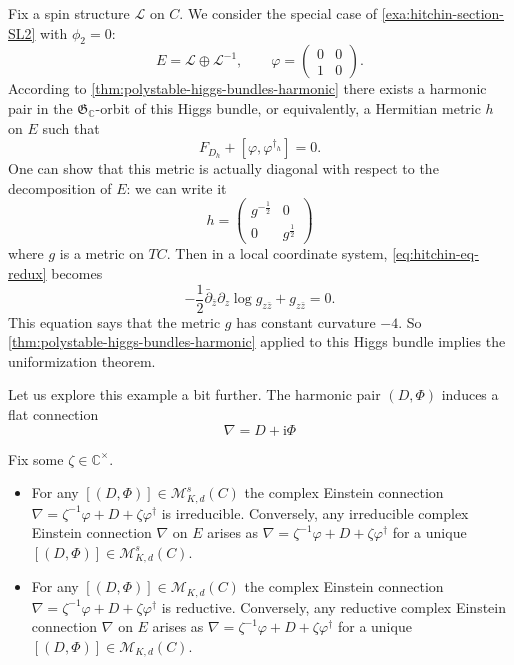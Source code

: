 \documentclass[12pt,letterpaper,reqno]{article}
\numberwithin{equation}{section}
\newcommand{\fG}{{\mathfrak G}}
\newcommand{\cL}{\ensuremath{\mathcal L}}
\newcommand{\cM}{\ensuremath{\mathcal M}}
\newcommand{\C}{\ensuremath{\mathbb C}}
\newcommand{\half}{\ensuremath{\frac{1}{2}}}
\newcommand{\I}{{\mathrm i}}
\newcommand{\fixme}[1]{{\color{orange}{[#1]}}}
\begin{document}
\begin{example} Fix a spin 
structure $\cL$ on $C$. We consider the special case of
\autoref{exa:hitchin-section-SL2} with $\phi_2 = 0$:
\begin{equation}
  E = \cL \oplus \cL^{-1}, \qquad \varphi = \begin{pmatrix} 0 & 0 \\ 1 &0 \end{pmatrix}.
\end{equation}
According to \autoref{thm:polystable-higgs-bundles-harmonic}
there exists a harmonic pair in the $\fG_\C$-orbit of this
Higgs bundle, or equivalently, a Hermitian metric $h$ on $E$ such that
\begin{equation} \label{eq:hitchin-eq-redux}
  F_{D_h} + [\varphi, \varphi^{\dagger_h}] = 0.
\end{equation}
One can show \fixme{...} that
this metric is actually diagonal with respect to the decomposition of $E$:
we can write it
\begin{equation}
  h = \begin{pmatrix} g^{-\half} & 0 \\ 0 & g^\half \end{pmatrix}
\end{equation}
where $g$ is a metric on $TC$. Then in a local coordinate system,
\eqref{eq:hitchin-eq-redux} becomes
\begin{equation}
  -\half \bar\partial_{\bar z} \partial_z \log g_{z \bar{z}} + g_{z \bar{z}} = 0.
\end{equation}
This equation says that the metric $g$ has constant curvature
$-4$. So \autoref{thm:polystable-higgs-bundles-harmonic} applied to this 
Higgs bundle implies the uniformization theorem.

Let us explore this example a bit further. The harmonic pair
$(D,\Phi)$ induces a flat connection
\begin{equation}
  \nabla = D + \I \Phi
\end{equation}
\fixme{...}

\end{example}


\begin{thm} \label{thm:reductive-connection-harmonic}
Fix some $\zeta \in \C^\times$.
\begin{itemize}
\item For any $[(D,\Phi)] \in \cM^s_{K,d}(C)$ the complex Einstein
connection $\nabla = \zeta^{-1} \varphi + D + \zeta \varphi^\dagger$ 
is irreducible.
Conversely, any irreducible complex Einstein connection
$\nabla$ on $E$ arises 
as $\nabla = \zeta^{-1} \varphi + D + \zeta \varphi^\dagger$ 
for a unique $[(D,\Phi)] \in \cM^s_{K,d}(C)$.
\item For any $[(D,\Phi)] \in \cM_{K,d}(C)$ the complex Einstein
connection $\nabla = \zeta^{-1} \varphi + D + \zeta \varphi^\dagger$ 
is reductive.
Conversely, any reductive complex Einstein connection
$\nabla$ on $E$ arises 
as $\nabla = \zeta^{-1} \varphi + D + \zeta \varphi^\dagger$ 
for a unique $[(D,\Phi)] \in \cM_{K,d}(C)$.
\end{itemize}
\end{thm}
\end{document}
